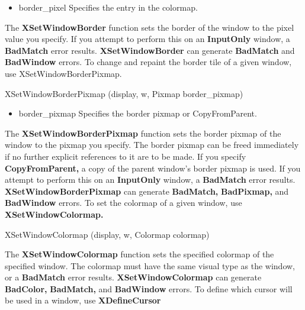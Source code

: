 \documentclass{report}
\begin{document}
\begin{itemize}
\begin{itemize}
                \item border\_pixel Specifies the entry in the colormap.
            \end{itemize}
            The \textbf{XSetWindowBorder} function sets the border of the window to the pixel value you specify. If you attempt to perform this on an \textbf{InputOnly} window, a \textbf{BadMatch} error results.
            \bigbreak \noindent 
            \textbf{XSetWindowBorder} can generate \textbf{BadMatch} and \textbf{BadWindow} errors.
            \bigbreak \noindent 
            To change and repaint the border tile of a given window, use XSetWindowBorderPixmap.
            \bigbreak \noindent 
            \begin{cppcode}
                XSetWindowBorderPixmap (display, w, Pixmap border_pixmap)
            \end{cppcode}
            \bigbreak \noindent
            \begin{itemize}
                \item border\_pixmap Specifies the border pixmap or CopyFromParent.
            \end{itemize}
            The \textbf{XSetWindowBorderPixmap} function sets the border pixmap of the window to the pixmap you specify. The border pixmap can be freed immediately if no further explicit references to it are to be made. If you specify \textbf{CopyFromParent,} a copy of the parent window’s border pixmap is used. If you attempt to perform this on an \textbf{InputOnly} window, a \textbf{BadMatch} error results.
            \bigbreak \noindent 
            \textbf{XSetWindowBorderPixmap} can generate \textbf{BadMatch,} \textbf{BadPixmap,} and \textbf{BadWindow} errors.
            \bigbreak \noindent 
            To set the colormap of a given window, use \textbf{XSetWindowColormap.}
            \bigbreak \noindent 
            \begin{cppcode}
                XSetWindowColormap (display, w, Colormap colormap)
            \end{cppcode}
            The \textbf{XSetWindowColormap} function sets the specified colormap of the specified window. The colormap must have the same visual type as the window, or a \textbf{BadMatch} error results.
            \bigbreak \noindent 
            \textbf{XSetWindowColormap} can generate \textbf{BadColor,} \textbf{BadMatch,} and \textbf{BadWindow} errors.
            \bigbreak \noindent 
            To define which cursor will be used in a window, use \textbf{XDefineCursor}
            \bigbreak \noindent 

\end{itemize}
\end{document}
